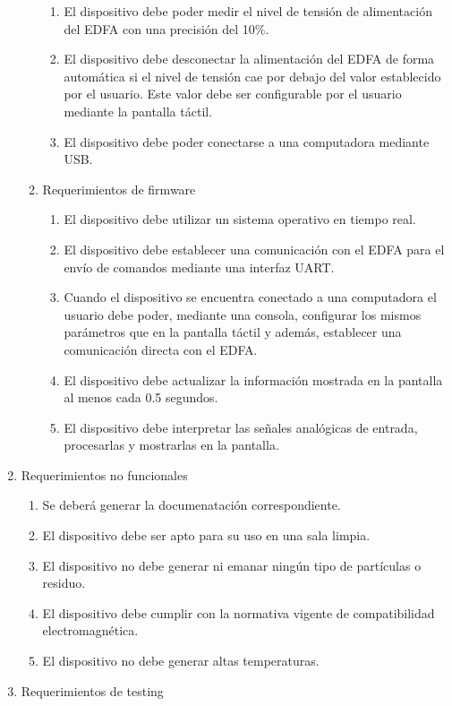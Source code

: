 \documentclass[
11pt, %
codirector, %
]{charter}
\begin{document}
\begin{enumerate}
\begin{enumerate}
\begin{enumerate}[label*=\arabic*.]
					\item El dispositivo debe poder medir el nivel de tensión de alimentación del EDFA con una precisión del 10\%.
					\item El dispositivo debe desconectar la alimentación del EDFA de forma automática si el nivel de tensión cae por debajo del valor establecido por el usuario. Este valor debe ser configurable por el usuario mediante la pantalla táctil.
					\item El dispositivo debe poder conectarse a una computadora mediante USB.
				\end{enumerate}
			\item Requerimientos de firmware
				\begin{enumerate}[label*=\arabic*.]
					\item El dispositivo debe utilizar un sistema operativo en tiempo real.
					\item El dispositivo debe establecer una comunicación con el EDFA para el envío de comandos mediante una interfaz UART.
					\item Cuando el dispositivo se encuentra conectado a una computadora el usuario debe poder, mediante una consola, configurar los mismos parámetros que en la pantalla táctil y además, establecer una comunicación directa con el EDFA.
					\item El dispositivo debe actualizar la información mostrada en la pantalla al menos cada 0.5 segundos.
					\item El dispositivo debe interpretar las señales analógicas de entrada, procesarlas y mostrarlas en la pantalla.
				\end{enumerate}
		\end{enumerate}
	\item Requerimientos no funcionales
		\begin{enumerate}
			\item Se deberá generar la documenatación correspondiente.
			\item El dispositivo debe ser apto para su uso en una sala limpia.
			\item El dispositivo no debe generar ni emanar ningún tipo de partículas o residuo.
			\item El dispositivo debe cumplir con la normativa vigente de compatibilidad electromagnética.
			\item El dispositivo no debe generar altas temperaturas.
		\end{enumerate}
	\item Requerimientos de testing

\end{enumerate}
\end{document}
